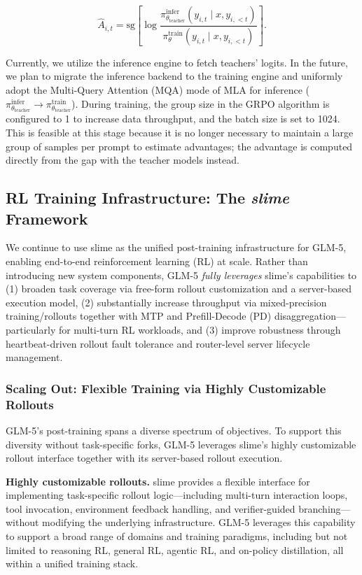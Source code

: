 \documentclass{article}
\theoremstyle{definition}
\begin{document}
\begin{equation}
    \hat{A}_{i,t} = \text{sg}\left[\log\frac{\pi_{\theta_{\text{teacher}}}^{\text{infer}}(y_{i,t}\mid x,y_{i,<t})}{\pi_\theta^{\text{train}}(y_{i,t}\mid x,y_{i,<t})}\right].
\end{equation}

Currently, we utilize the inference engine to fetch teachers' logits. In the future, we plan to migrate the inference backend to the training engine and uniformly adopt the Multi-Query Attention (MQA) mode of MLA for inference ($\pi_{\theta_{\text{teacher}}}^{\text{infer}}\rightarrow\pi_{\theta_{\text{teacher}}}^{\text{train}}$).
During training, the group size in the GRPO algorithm is configured to 1 to increase data throughput, and the batch size is set to 1024. This is feasible at this stage because it is no longer necessary to maintain a large group of samples per prompt to estimate advantages; the advantage is computed directly from the gap with the teacher models instead.

\subsection{RL Training Infrastructure: The \emph{slime} Framework}

We continue to use slime as the unified post-training infrastructure for GLM-5, enabling end-to-end reinforcement learning (RL) at scale. Rather than introducing new system components, GLM-5 \emph{fully leverages} slime's capabilities to (1) broaden task coverage via free-form rollout customization and a server-based execution model, (2) substantially increase throughput via mixed-precision training/rollouts together with MTP and Prefill-Decode (PD) disaggregation---particularly for multi-turn RL workloads, and (3) improve robustness through heartbeat-driven rollout fault tolerance and router-level server lifecycle management.

\subsubsection{Scaling Out: Flexible Training via Highly Customizable Rollouts}
GLM-5’s post-training spans a diverse spectrum of objectives. To support this diversity without task-specific forks, GLM-5 leverages slime's highly customizable rollout interface together with its server-based rollout execution.

\textbf{Highly customizable rollouts.} slime provides a flexible interface for implementing task-specific rollout logic---including multi-turn interaction loops, tool invocation, environment feedback handling, and verifier-guided branching---without modifying the underlying infrastructure. GLM-5 leverages this capability to support a broad range of domains and training paradigms, including but not limited to reasoning RL, general RL, agentic RL, and on-policy distillation, all within a unified training stack.
\end{document}
